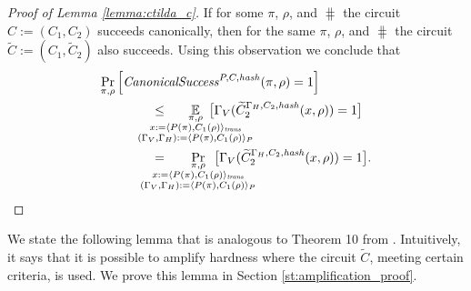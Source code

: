 %
\begin{proof}[Proof of Lemma \ref{lemma:ctilda_c}]
If for some $\pi$, $\rho$, and $\hash$ the circuit $C := (C_1, C_2)$ succeeds canonically,
then for the same $\pi$, $\rho$, and $\hash$ the circuit $\widetilde{C} := (C_1, \widetilde{C}_2)$ also succeeds.
Using this observation we conclude that
\begin{align*}
  &\underset{\pi, \rho}{\Pr}\left[\CanonicalSuccess^{P, C, \hash}(\pi, \rho) = 1\right] \\
  &\IndII \leq
  \mkern33mu
    \underset{
      \mathclap{
        \substack{\pi, \rho \\
        x := \langle P(\pi), C_1(\rho) \rangle_{\mathit{trans}} \\
        (\Gamma_V, \Gamma_H) := \langle P(\pi), C_1(\rho) \rangle_{P}
      }}}
    {\mathbb{E}}\mkern13mu\big[\Gamma_V(\widetilde{C}_2^{\Gamma_H, C_2, \hash}(x, \rho)) = 1\big] \\
  &\IndII =
  \mkern33mu
    \underset{
      \mathclap{
        \substack{\pi, \rho \\
        x := \langle P(\pi), C_1(\rho) \rangle_{\mathit{trans}} \\
        (\Gamma_V, \Gamma_H) := \langle P(\pi), C_1(\rho) \rangle_{P}
      }}}
    {\Pr}\mkern13mu\big[\Gamma_V(\widetilde{C}_2^{\Gamma_H, C_2, \hash}(x, \rho)) = 1\big].
\end{align*}
\end{proof}
%
We state the following lemma that is analogous to Theorem 10 from \cite{holenstein2011general}.
Intuitively, it says that it is possible to amplify hardness where the circuit $\widetilde{C}$, meeting certain criteria, is used.
We prove this lemma in Section \ref{st:amplification_proof}.
